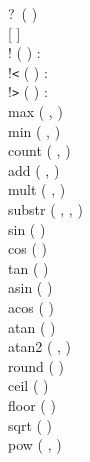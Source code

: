 \documentclass[a4,14pt,latin1]{article}
\begin{document}
{\begin{tabbing}
          \>   \> ?\ (  ) \OR \\
          \>   \> [  ]\OR \\
          \>   \>! (  )  :\ \OR \\
          \>   \>!\verb"<" (  )  :\ \OR \\
          \>   \>!\verb">" (  )  :\ \OR \\
          \>   \>max (  ,  )\OR \\
          \>   \>min (  ,  )\OR \\
          \>   \>count (  ,  )\OR \\
          \>   \>add (  ,  )\OR \\
          \>   \>mult (  ,  )\OR \\
          \>   \>substr ( , ,  )\OR \\
          \>   \>sin (  )\OR \\
          \>   \>cos (  )\OR \\
          \>   \>tan (  )\OR \\
          \>   \>asin (  )\OR \\
          \>   \>acos (  )\OR \\
          \>   \>atan (  )\OR \\
          \>   \>atan2 ( ,  )\OR \\
          \>   \>round (  )\OR \\
          \>   \>ceil (  )\OR \\
          \>   \>floor (  )\OR \\
          \>   \>sqrt (  )\OR \\
          \>   \>pow ( ,  )\OR \\

\end{tabbing}}
\end{document}
